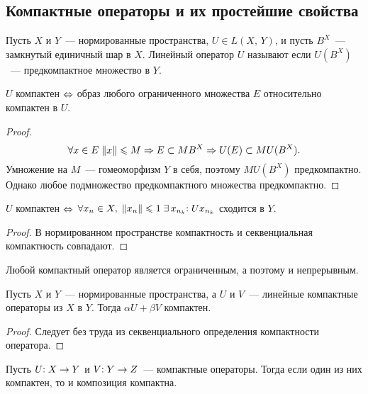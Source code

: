 \documentclass{notes}
\begin{document}
\subsection{Компактные операторы и их простейшие свойства}

	\begin{de}
		Пусть $X$ и $Y$~--- нормированные пространства, $U \in L(X, \, Y)$, и пусть $B^X$~--- замкнутый единичный шар в $X$. Линейный оператор $U$ называют  если $U(B^X)$~--- предкомпактное множество в $Y$.
	\end{de}

	\begin{st}
		$U$ компактен $\Leftrightarrow$ образ любого ограниченного множества $E$ относительно компактен в $U$.
		\begin{proof}
			\[
				\forall x \in E \; \|x\| \leqslant M \Rightarrow E \subset MB^X \Rightarrow U(E) \subset M U(B^X).
			\]
			Умножение на $M$~--- гомеоморфизм $Y$ в себя, поэтому $MU(B^X)$ предкомпактно. Однако любое подмножество предкомпактного множества предкомпактно.
		\end{proof}
	\end{st}

	\begin{st}
		$U$ компактен $\Leftrightarrow$ $\forall x_n \in X, \; \|x_n\| \leqslant 1 \; \exists \, x_{n_k}\text{\text{:}} \; Ux_{n_k}$ сходится в $Y$.
		\begin{proof}
			В нормированном пространстве компактность и секвенциальная компактность совпадают. 
		\end{proof}
	\end{st}

	\begin{rem}
		Любой компактный оператор является ограниченным, а поэтому и непрерывным.
	\end{rem}

	\begin{thm}
		Пусть $X$ и $Y$~--- нормированные пространства, а $U$ и $V$~--- линейные компактные операторы из $X$ в $Y$. Тогда $\alpha U + \beta V$ компактен.
		\begin{proof}
			Следует без труда из секвенциального определения компактности оператора.
		\end{proof}
	\end{thm}

	\begin{thm}
		Пусть $U\text{\text{:}} \; X \to Y$ и $V \text{\text{:}} \; Y \to Z$~--- компактные операторы. Тогда если один из них компактен, то и композиция компактна.
	\end{thm}
\end{document}
